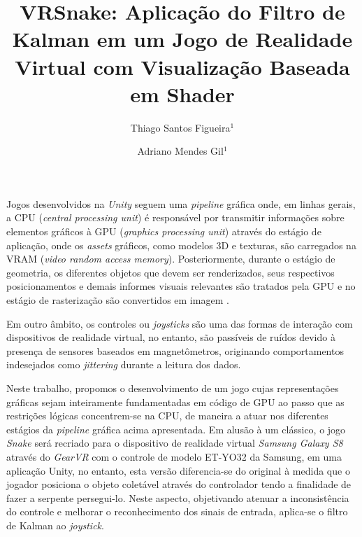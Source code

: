 \documentclass{vgtc}                          %
\title{VRSnake: Aplicação do Filtro de Kalman em um Jogo de Realidade Virtual com Visualização Baseada em Shader}
\author{Thiago Santos Figueira$^{1}$
\and Adriano Mendes Gil$^{1}$}
\affiliation{\scriptsize $^{1}$Samsung Instituto de Desenvolvimento para a Informática da Amazônia
  (SIDIA)\\
  Manaus -- AM -- Brazil\\}
\begin{document}

\maketitle

Jogos desenvolvidos na \textit{Unity} seguem uma \textit{pipeline} gráfica onde, em linhas gerais, a CPU (\textit{central processing unit}) é responsável por transmitir informações sobre elementos gráficos à GPU (\textit{graphics processing unit}) através do estágio de aplicação, onde os \textit{assets} gráficos, como modelos 3D e texturas, são carregados na VRAM (\textit{video random access memory}). Posteriormente, durante o estágio de geometria, os diferentes objetos que devem ser renderizados, seus respectivos posicionamentos e demais informes visuais relevantes são tratados pela GPU e no estágio de rasterização são convertidos em imagem \cite{akenine2008real}.

Em outro âmbito, os controles ou \textit{joysticks} são uma das formas de interação com dispositivos de realidade virtual, no entanto, são passíveis de ruídos devido à presença de sensores baseados em magnetômetros, originando comportamentos indesejados como \textit{jittering} durante a leitura dos dados. 

Neste trabalho, propomos o desenvolvimento de um jogo cujas representações gráficas sejam inteiramente fundamentadas em código de GPU ao passo que as restrições lógicas concentrem-se na CPU, de maneira a atuar nos diferentes estágios da \textit{pipeline} gráfica acima apresentada. Em alusão à um clássico, o jogo \textit{Snake} será recriado para o dispositivo de realidade virtual \textit{Samsung Galaxy S8} através do \textit{GearVR} com o controle de modelo ET-YO32 da Samsung, em uma aplicação Unity, no entanto, esta versão diferencia-se do original à medida que o jogador posiciona o objeto coletável através do controlador tendo a finalidade de fazer a serpente persegui-lo. Neste aspecto, objetivando atenuar a inconsistência do controle e melhorar o reconhecimento dos sinais de entrada, aplica-se o filtro de Kalman ao \textit{joystick}.
\end{document}

